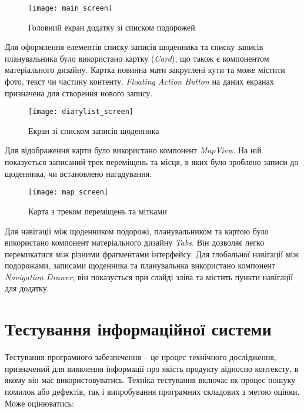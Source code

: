 \documentclass[../main.tex]{subfiles}
\begin{document}
\begin{figure}[H]
	\centering
	\texttt{[image: main\_screen]}
	\caption{Головний екран додатку зі списком подорожей}
	\label{figure:main_screen}
\end{figure}

Для оформлення елементів списку записів щоденника та списку записів планувальника було використано картку (\textit{Card}), що також є компонентом матеріального дизайну. Картка повинна мати закруглені кути та може містити фото, текст чи частину контенту. \textit{Floating Action Button} на даних екранах призначена для створення нового запису.

\begin{figure}[H]
	\centering
	\texttt{[image: diarylist\_screen]}
	\caption{Екран зі списком записів щоденника}
	\label{figure:diary_list_screen}
\end{figure}

Для відображення карти було використано компонент \textit{MapView}. На ній показується записаний трек переміщень та місця, в яких було зроблено записи до щоденника, чи встановлено нагадування.

\begin{figure}[H]
	\centering
	\texttt{[image: map\_screen]}
	\caption{Карта з треком переміщень та мітками}
	\label{figure:map_screen}
\end{figure}

Для навігації між щоденником подорожі, планувальником та картою було використано компонент матеріального дизайну \textit{Tabs}. Він дозволяє легко перемикатися між різними фрагментами інтерфейсу. Для глобальної навігації між подорожами, записами щоденника та планувальнка використано компонент \textit{Navigation Drawer}, він показується при слайді зліва та містить пункти навігації для додатку. 


\section{Тестування інформаційної системи}

Тестування програмного забезпечення -- це процес технічного дослідження, призначений для виявлення інформації про якість продукту відносно контексту, в якому він має використовуватись. Техніка тестування включає як процес пошуку помилок або дефектів, так і випробування програмних складових з метою оцінки. Може оцінюватись:
\end{document}
